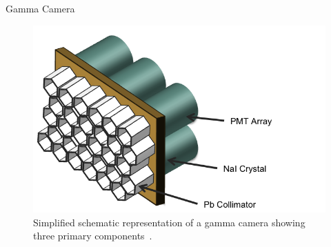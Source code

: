 

\begin{frame}{Gamma Camera }
    \centering{}
    \begin{figure}[]
        \centering
        \includegraphics[height=0.8\textheight]{images/gammacamera.png}
        \caption{\normalsize Simplified schematic representation of a gamma camera showing three primary components~\cite{sanders18}.}
    \end{figure}
\end{frame}

